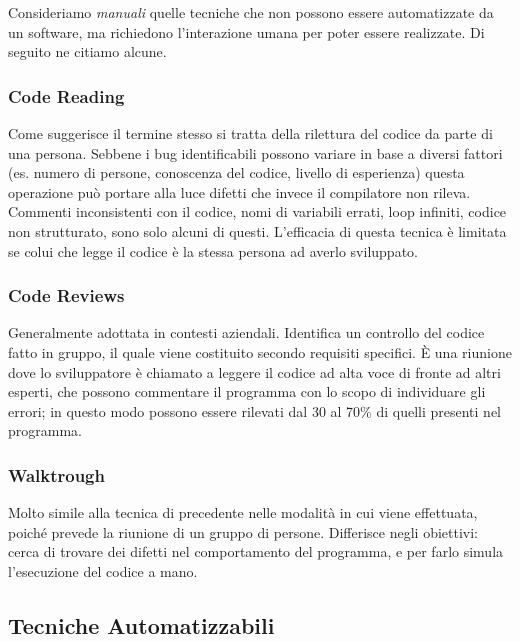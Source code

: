     Consideriamo \textit{manuali} quelle tecniche che non possono essere automatizzate da un software, ma richiedono l'interazione umana per poter essere realizzate. Di seguito ne citiamo alcune.\newline
    
        \subsubsection{Code Reading}

        Come suggerisce il termine stesso si tratta della rilettura del codice da parte di una persona. Sebbene i bug identificabili possono variare in base a diversi fattori (es. numero di persone, conoscenza del codice, livello di esperienza) questa operazione può portare alla luce difetti che invece il compilatore non rileva. Commenti inconsistenti con il codice, nomi di variabili errati, loop infiniti, codice non strutturato, sono solo alcuni di questi. L'efficacia di questa tecnica è limitata se colui che legge il codice è la stessa persona ad averlo sviluppato.\newline

        \subsubsection{Code Reviews}

        Generalmente adottata in contesti aziendali. Identifica un controllo del codice fatto in gruppo, il quale viene costituito secondo requisiti specifici. \`E una riunione dove lo sviluppatore è chiamato a leggere il codice ad alta voce di fronte ad altri esperti, che possono commentare il programma con lo scopo di individuare gli errori; in questo modo possono essere rilevati dal 30 al 70\% di quelli presenti nel programma.\newline

        \subsubsection{Walktrough}

        Molto simile alla tecnica di precedente nelle modalità in cui viene effettuata, poiché prevede la riunione di un gruppo di persone. Differisce negli obiettivi: cerca di trovare dei difetti nel comportamento del programma, e per farlo simula l'esecuzione del codice a mano.\newline
        
    \subsection{Tecniche Automatizzabili}
    
